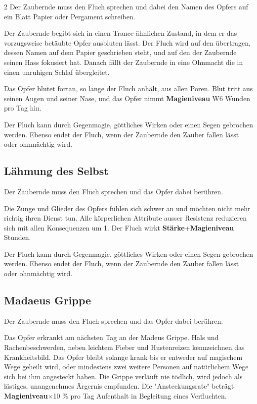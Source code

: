 \begin{multicols*}{2}
Der Zaubernde muss den Fluch sprechen und dabei den Namen des Opfers auf ein Blatt Papier oder Pergament schreiben.

Der Zaubernde begibt sich in einen Trance ähnlichen Zustand, in dem er das vorzugsweise betäubte Opfer ausbluten lässt. Der Fluch wird auf den übertragen, dessen Namen auf dem Papier geschrieben steht, und auf den der Zaubernde seinen Hass fokusiert hat. Danach fällt der Zaubernde in eine Ohnmacht die in einen unruhigen Schlaf übergleitet.

Das Opfer blutet fortan, so lange der Fluch anhält, aus allen Poren. Blut tritt aus seinen Augen und seiner Nase, und das Opfer nimmt \textbf{Magieniveau} W6 Wunden pro Tag hin.

Der Fluch kann durch Gegenmagie, göttliches Wirken oder einen Segen gebrochen werden. Ebenso endet der Fluch, wenn der Zaubernde den Zauber fallen lässt oder ohnmächtig wird.



\subsection{Lähmung des Selbst}

Der Zaubernde muss den Fluch sprechen und das Opfer dabei berühren.

Die Zunge und Glieder des Opfers fühlen sich schwer an und möchten nicht mehr richtig ihren Dienst tun.  Alle körperlichen Attribute ausser Resistenz reduzieren sich mit allen Konsequenzen um 1. Der Fluch wirkt \textbf{Stärke}+\textbf{Magieniveau} Stunden.

Der Fluch kann durch Gegenmagie, göttliches Wirken oder einen Segen gebrochen werden. Ebenso endet der Fluch, wenn der Zaubernde den Zauber fallen lässt oder ohnmächtig wird.



\subsection{Madaeus Grippe}

Der Zaubernde muss den Fluch sprechen und das Opfer dabei berühren.

Das Opfer erkrankt am nächsten Tag an der Madeus Grippe. Hals und Rachenbeschwerden, neben leichtem Fieber und Hustenreizen kennzeichnen das Krankheitsbild. Das Opfer bleibt solange krank bis er entweder auf magischem Wege geheilt wird, oder mindestens zwei weitere Personen auf natürlichem Wege sich bei ihm angesteckt haben. Die Grippe verläuft nie tödlich, wird jedoch als lästiges, unangenehmes Ärgernis empfunden. Die "Ansteckungsrate" beträgt \textbf{Magieniveau}×10 \% pro Tag Aufenthalt in Begleitung eines Verfluchten.


\end{multicols*}
